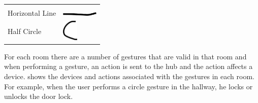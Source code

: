\begin{table}[h!]
\begin{tabular}{ll}
\begin{minipage}{.3\textwidth}
\end{minipage}
\\[0.5cm]
Horizontal Line       &
\begin{minipage}{.3\textwidth}
  \includegraphics[width=1.75cm]{images/gesture-horizontal-line}
\end{minipage}
\\[0.5cm]
Half Circle           &                      
\begin{minipage}{.3\textwidth}
  \includegraphics[height=1cm]{images/gesture-half-circle}
\end{minipage}
\end{tabular}
\end{table}

For each room there are a number of gestures that are valid in that room and when performing a gesture, an action is sent to the hub and the action affects a device.  shows the devices and actions associated with the gestures in each room. For example, when the user performs a circle gesture in the hallway, he locks or unlocks the door lock.

